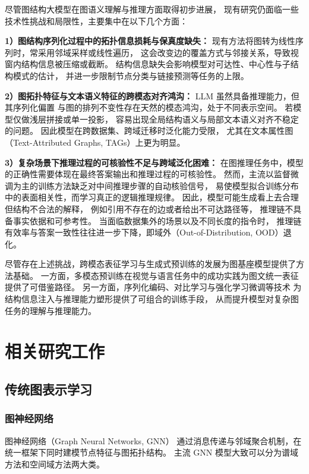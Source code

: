 尽管图结构大模型在图语义理解与推理方面取得初步进展，
现有研究仍面临一些技术性挑战和局限性，主要集中在以下几个方面：

\textbf{1）图结构序列化过程中的拓扑信息损耗与保真度缺失：} 
现有方法将图转为线性序列时，常采用邻域采样或线性遍历，
这会改变边的覆盖方式与邻接关系，导致视窗内结构信息被压缩或截断。
结构信息缺失会影响模型对可达性、中心性与子结构模式的估计，
并进一步限制节点分类与链接预测等任务的上限。

\textbf{2）图拓扑特征与文本语义特征的跨模态对齐鸿沟：} 
LLM 虽然具备推理能力，但其序列化偏置
与图的排列不变性存在天然的模态鸿沟，处于不同表示空间。
若模型仅做浅层拼接或单一投影，
容易出现全局结构语义与局部文本语义对齐不稳定的问题。
因此模型在跨数据集、跨域迁移时泛化能力受限，
尤其在文本属性图（Text-Attributed Graphs, TAGs）上更为明显。


\textbf{3）复杂场景下推理过程的可核验性不足与跨域泛化困难：}
在图推理任务中，模型的正确性需要体现在最终答案输出和推理过程的可核验性。
然而，主流以监督微调为主的训练方法缺乏对中间推理步骤的自动核验信号，
易使模型拟合训练分布中的表面相关性，而学习真正的逻辑推理规律。
因此，模型可能生成看上去合理但结构不合法的解释，
例如引用不存在的边或者给出不可达路径等，
推理链不具备事实依据和可参考性。
当面临数据集外的场景以及不同长度的指令时，
推理链有效率与答案一致性往往进一步下降，即域外（Out-of-Distribution, OOD）退化。

尽管存在上述挑战，跨模态表征学习与生成式预训练的发展为图基座模型提供了方法基础。
一方面，多模态预训练在视觉与语言任务中的成功实践为图文统一表征提供了可借鉴路径。
另一方面，序列化编码、对比学习与强化学习微调等技术
为结构信息注入与推理能力塑形提供了可组合的训练手段，
从而提升模型对复杂图任务的理解与推理能力。


\section{相关研究工作}
\subsection{传统图表示学习}
\subsubsection{图神经网络}

图神经网络（Graph Neural Networks, GNN）\cite{Kipf2016SemiSupervisedCW,Wu2019ACS,Han2023PiVePW,Wu2019SimplifyingGC,Wang2021BagOT}
通过消息传递与邻域聚合机制，在统一框架下同时建模节点特征与图拓扑结构。
主流 GNN 模型大致可以分为谱域方法和空间域方法两大类。

